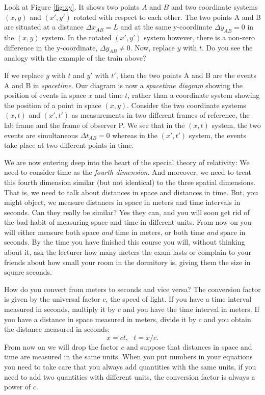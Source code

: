 {\begin{multicols}{2}
Look at Figure \ref{fig:xy}. It shows two points $A$ and $B$ and two coordinate systems $(x,y)$ and $(x',y')$ rotated with respect to each other. The two points A and B are situated at a distance $\Delta x_{AB}=L$ and at the same y-coordinate $\Delta y_{AB}=0$ in the $(x,y)$ system. In the rotated $(x',y')$ system however, there is a non-zero difference in the y-coordinate, $\Delta y_{AB}\ne0$. Now, replace $y$ with $t$. Do you see the analogy with the example of the train above?

If we replace $y$ with $t$ and $y'$ with $t'$, then the two points A and B are the events A and B in {\it spacetime}. Our diagram is now a {\it spacetime diagram\label{pg:spacetimediag}} showing the position of events in space $x$ and time $t$, rather than a coordinate system showing the position of a point in space $(x,y)$. Consider the two coordinate systems $(x,t)$ and $(x',t')$ as measurements in two different frames of reference, the lab frame and the frame of observer P. We see that in the $(x,t)$ system, the two events are simultaneous $\Delta t_{AB}=0$ whereas in the $(x',t')$ system, the events take place at two different points in time.

We are now entering deep into the heart of the special theory of relativity: We need to consider time as the {\it fourth dimension}. And moreover, we need to treat this fourth dimension similar (but not identical) to the three spatial dimensions. That is, we need to talk about distances in space and distances in time. But, you might object, we measure distances in space in meters and time intervals in seconds. Can they really be similar? Yes they can, and you will soon get rid of the bad habit of measuring space and time in different units. From now on you will either measure both space \emph{and} time in meters, or both time \emph{and} space in seconds. By the time you have finished this course you will, without thinking about it, ask the lecturer how many meters the exam lasts or complain to your friends about how small your room in the dormitory is, giving them the size in square seconds.

How do you convert from meters to seconds and vice versa? The conversion factor is given by the universal factor $c$, the speed of light. If you have a time interval measured in seconds, multiply it by $c$ and you have the time interval in meters. If you have a distance in space measured in meters, divide it by $c$ and you obtain the distance measured in seconds:
\[
x=ct,\ \ \ t=x/c.
\]
From now on we will drop the factor $c$ and suppose that distances in space and time are measured in the same units. When you put numbers in your equations you need to take care that you always add quantities with the same units, if you need to add two quantities with different units, the conversion factor is always a power of $c$.


\end{multicols}}
